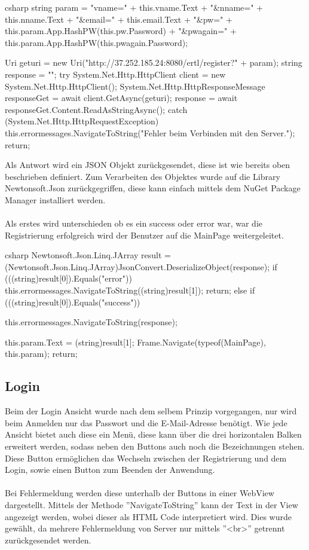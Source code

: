 \begin{code}{csharp}
	string param = "vname=" + this.vname.Text + "&nname=" + this.nname.Text + "&email=" + this.email.Text + "&pw=" + this.param.App.HashPW(this.pw.Password) + "&pwagain=" + this.param.App.HashPW(this.pwagain.Password);
	
	Uri geturi = new Uri("http://37.252.185.24:8080/ertl/register?" + param);
	string response = "";
	try
	{
		System.Net.Http.HttpClient client = new System.Net.Http.HttpClient();
		System.Net.Http.HttpResponseMessage responseGet = await client.GetAsync(geturi);
		response = await responseGet.Content.ReadAsStringAsync();
	}
	catch (System.Net.Http.HttpRequestException)
	{
		this.errormessages.NavigateToString("Fehler beim Verbinden mit den Server.");
		return;
	}
\end{code}

Als Antwort wird ein JSON Objekt zurückgesendet, diese ist wie bereits oben beschrieben definiert. Zum Verarbeiten des Objektes wurde auf die Library Newtonsoft.Json zurückgegriffen, diese kann einfach mittels dem NuGet Package Manager installiert werden.
\\\\
Als erstes wird unterschieden ob es ein success oder error war, war die Registrierung erfolgreich wird der Benutzer auf die MainPage weitergeleitet.

\begin{code}{csharp}
Newtonsoft.Json.Linq.JArray result = (Newtonsoft.Json.Linq.JArray)JsonConvert.DeserializeObject(response);
if (((string)result[0]).Equals("error"))
{
	this.errormessages.NavigateToString((string)result[1]);
	return;
}
else if (((string)result[0]).Equals("success"))
{
	this.errormessages.NavigateToString(response);
	
	this.param.Text = (string)result[1];
	Frame.Navigate(typeof(MainPage), this.param);
	return;
}
\end{code}

\subsection{Login}

Beim der Login Ansicht wurde nach dem selbem Prinzip vorgegangen, nur wird beim Anmelden nur das Passwort und die E-Mail-Adresse benötigt. Wie jede Ansicht bietet auch diese ein Menü, diese kann über die drei horizontalen Balken erweitert werden, sodass neben den Buttons auch noch die Bezeichnungen stehen. Diese Button ermöglichen das Wechseln zwischen der Registrierung und dem Login, sowie einen Button zum Beenden der Anwendung. 
\\\\
Bei Fehlermeldung werden diese unterhalb der Buttons in einer WebView dargestellt. Mittels der Methode ''NavigateToString'' kann der Text in der View angezeigt werden, wobei dieser als HTML Code interpretiert wird. Dies wurde gewählt, da mehrere Fehlermeldung von Server nur mittels ''<br>'' getrennt zurückgesendet werden.

